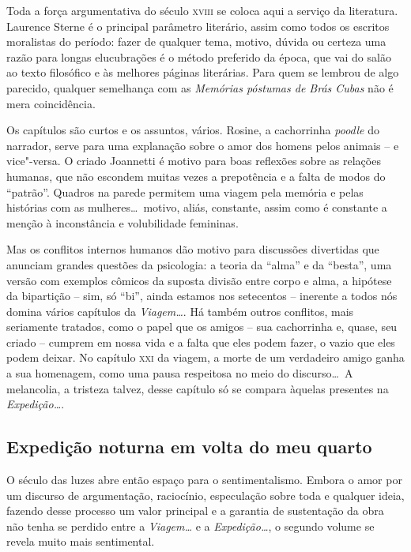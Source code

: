 Toda a força argumentativa do século \textsc{xviii} se coloca aqui a serviço da
literatura. Laurence Sterne é o principal parâmetro literário, assim
como todos os escritos moralistas do período: fazer de qualquer tema,
motivo, dúvida ou certeza uma razão para longas elucubrações é o método
preferido da época, que vai do salão ao texto filosófico e às melhores
páginas literárias. Para quem se lembrou de algo parecido, qualquer
semelhança com as \textit{Memórias póstumas de Brás Cubas} não é mera
coincidência.

Os capítulos são curtos e os assuntos, vários. Rosine, a cachorrinha
\textit{poodle} do narrador, serve para uma explanação sobre o amor dos homens
pelos animais -- e vice"-versa. O criado Joannetti é motivo para boas
reflexões sobre as relações humanas, que não escondem muitas vezes a
prepotência e a falta de modos do ``patrão''. Quadros na parede permitem
uma viagem pela memória e pelas histórias com as mulheres\ldots\ motivo,
aliás, constante, assim como é constante a menção à inconstância e volubilidade femininas. 

Mas os conflitos internos humanos dão motivo para discussões divertidas
que anunciam grandes questões da psicologia: a teoria da ``alma'' e da
``besta'', uma versão com exemplos cômicos da suposta divisão entre corpo
e alma, a hipótese da bipartição -- sim,  só ``bi'', ainda estamos nos
setecentos -- inerente a todos nós domina vários capítulos da
\textit{Viagem\ldots}. Há também outros conflitos, mais seriamente
tratados, como o papel que os amigos -- sua cachorrinha e, quase, seu
criado -- cumprem em nossa vida  e a falta que eles podem fazer, o vazio
que eles podem deixar. No capítulo \textsc{xxi} da viagem, a morte de um
verdadeiro amigo ganha a sua homenagem, como uma pausa respeitosa no
meio do discurso\ldots\ A melancolia, a tristeza talvez, desse capítulo só
se compara àquelas presentes na \textit{Expedição\ldots}. 

\subsection{Expedição noturna em volta do meu quarto}

O século das luzes abre então espaço para o sentimentalismo. Embora o
amor por um discurso de argumentação, raciocínio, especulação sobre
toda e qualquer ideia, fazendo desse processo um valor principal e a
garantia de sustentação da obra não tenha se perdido entre a
\textit{Viagem\ldots} e a \textit{Expedição\ldots},  o segundo volume se
revela muito mais sentimental.

